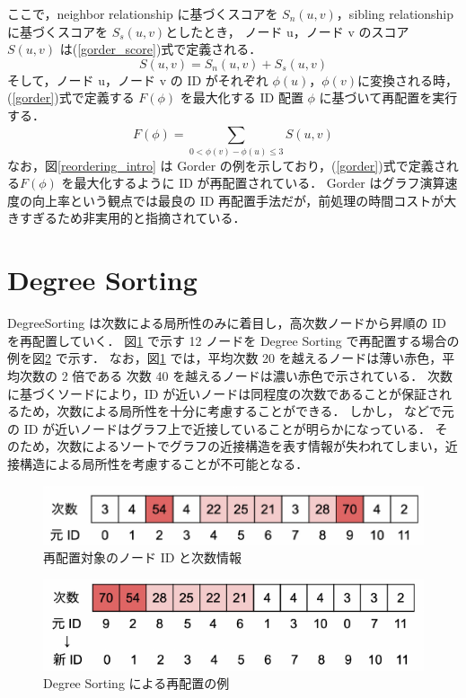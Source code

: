 ここで，neighbor relationship に基づくスコアを $S_{n}(u,v)$，sibling relationship に基づくスコアを $S_{s}(u,v)$としたとき，
ノード u，ノード v のスコア $S(u,v)$ は(\ref{gorder_score})式で定義される．
\begin{equation}
  S(u,v) = S_{n}(u,v) + S_{s}(u,v) \label{gorder_score}
\end{equation}
そして，ノード u，ノード v の ID がそれぞれ $\phi(u)$，$\phi(v)$に変換される時，
(\ref{gorder})式で定義する $F(\phi)$ を最大化する ID 配置 $\phi$ に基づいて再配置を実行する．
\begin{equation}
  F(\phi) = \sum_{0<\phi(v)-\phi(u)\leq3}^{} S(u,v) \label{gorder}
\end{equation}
なお，図\ref{reordering_intro} は Gorder の例を示しており，(\ref{gorder})式で定義される$F(\phi)$ を最大化するように ID が再配置されている．
Gorder はグラフ演算速度の向上率という観点では最良の ID 再配置手法だが，前処理の時間コストが大きすぎるため非実用的と指摘されている\cite{balaji2018graph, faldu2019closer}．
\section{Degree Sorting}
DegreeSorting は次数による局所性のみに着目し，高次数ノードから昇順の ID を再配置していく．
図\ref{Original} で示す 12 ノードを Degree Sorting で再配置する場合の例を図\ref{degree_sorting} で示す．
なお，図\ref{Original} では，平均次数 20 を越えるノードは薄い赤色，平均次数の 2 倍である 次数 40 を越えるノードは濃い赤色で示されている．
次数に基づくソードにより，ID が近いノードは同程度の次数であることが保証されるため，次数による局所性を十分に考慮することができる．
しかし，\cite{balaji2018graph, faldu2019closer} などで元の ID が近いノードはグラフ上で近接していることが明らかになっている．
そのため，次数によるソートでグラフの近接構造を表す情報が失われてしまい，近接構造による局所性を考慮することが不可能となる．
\begin{figure}[t]
  \centering
  \includegraphics[width=\linewidth]{./figure/original.pdf}
  \caption{再配置対象のノード ID と次数情報}
  \label{Original}
\end{figure}
\begin{figure}[t]
  \centering
  \includegraphics[width=\linewidth]{./figure/degree_sorting.pdf}
  \caption{Degree Sorting による再配置の例}
  \label{degree_sorting}
\end{figure}
